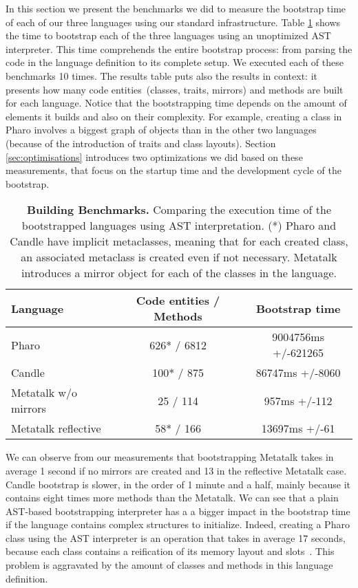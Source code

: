In this section we present the benchmarks we did to measure the bootstrap time of each of our three languages using our standard infrastructure. Table \ref{tb:measurements} shows the time to bootstrap each of the three languages using an unoptimized AST interpreter. This time comprehends the entire bootstrap process: from parsing the code in the language definition to its complete setup. We executed each of these benchmarks 10 times. The results table puts also the results in context: it presents how many code entities~(classes, traits, mirrors) and methods are built for each language. Notice that the bootstrapping time depends on the amount of elements it builds and also on their complexity. For example, creating a class in Pharo involves a biggest graph of objects than in the other two languages (because of the introduction of traits and class layouts). Section \ref{sec:optimisations} introduces two optimizations we did based on these measurements, that focus on the startup time and the development cycle of the bootstrap. 

 \begin{table}[ht]
 \small
 	\centering
 	\begin{tabular}{lcc}
			\toprule
			\textbf{Language}
			& \xspace\textbf{Code entities / Methods}\xspace
			& \xspace\textbf{Bootstrap time}\\
		\toprule
		Pharo & 626* / 6812 & 9004756ms +/-621265 \\\midrule
		Candle & 100* / 875 & 86747ms +/-8060 \\\midrule
		Metatalk w/o mirrors & 25 / 114 & 957ms +/-112 \\\midrule
		Metatalk reflective & 58* / 166 & 13697ms +/-61 \\\bottomrule
 	\end{tabular}
		\vspace*{0.2cm}
 	\caption{\small\textbf{Building Benchmarks.} Comparing the execution time of the bootstrapped languages using AST interpretation. (*) Pharo and Candle have implicit metaclasses, meaning that for each created class, an associated metaclass is created even if not necessary. Metatalk introduces a mirror object for each of the classes in the language.\label{tb:measurements}}
 \end{table}

We can observe from our measurements that bootstrapping Metatalk takes in average 1 second if no mirrors are created and 13 in the reflective Metatalk case. Candle bootstrap is slower, in the order of 1 minute and a half, mainly because it contains eight times more methods than the Metatalk. We can see that a plain AST-based bootstrapping interpreter has a a bigger impact in the bootstrap time if the language contains complex structures to initialize.  Indeed, creating a Pharo class using the AST interpreter is an operation that takes in average 17 seconds, because each class contains a reification of its memory layout and slots~\cite{Verw11a}. This problem is aggravated by the amount of classes and methods in this language definition.

